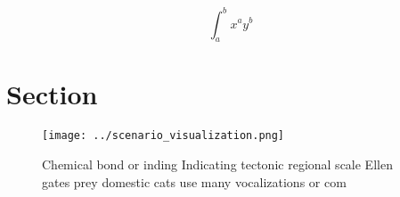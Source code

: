 \documentclass[a4paper]{article}
\begin{document}
\[ \int_{a}^{b}{x^{a}y^{b}} \]

\section{Section}

\begin{figure}
\centering
\texttt{[image: ../scenario\_visualization.png]}
\caption{Chemical bond or inding Indicating tectonic regional scale Ellen gates prey domestic cats use many vocalizations or com
}
\end{figure}
 
\end{document}
